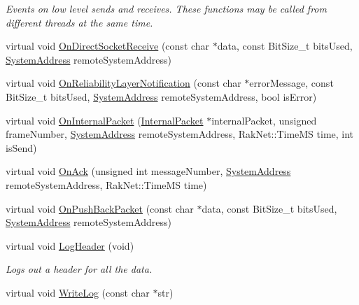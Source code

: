 \begin{DoxyCompactItemize}
\begin{DoxyCompactList}\small\item\em Events on low level sends and receives. These functions may be called from different threads at the same time. \end{DoxyCompactList}\item 
virtual void \hyperlink{class_rak_net_1_1_packet_logger_a94dd0e79e3e51933166180f3391a9387}{On\-Direct\-Socket\-Receive} (const char $\ast$data, const Bit\-Size\-\_\-t bits\-Used, \hyperlink{struct_rak_net_1_1_system_address}{System\-Address} remote\-System\-Address)
\item 
virtual void \hyperlink{class_rak_net_1_1_packet_logger_aba0d74f42ad8b50ed50e439d4d13fafb}{On\-Reliability\-Layer\-Notification} (const char $\ast$error\-Message, const Bit\-Size\-\_\-t bits\-Used, \hyperlink{struct_rak_net_1_1_system_address}{System\-Address} remote\-System\-Address, bool is\-Error)
\item 
virtual void \hyperlink{class_rak_net_1_1_packet_logger_a96775f5fb8fa1be7c55b78628ec1ae94}{On\-Internal\-Packet} (\hyperlink{struct_rak_net_1_1_internal_packet}{Internal\-Packet} $\ast$internal\-Packet, unsigned frame\-Number, \hyperlink{struct_rak_net_1_1_system_address}{System\-Address} remote\-System\-Address, Rak\-Net\-::\-Time\-M\-S time, int is\-Send)
\item 
virtual void \hyperlink{class_rak_net_1_1_packet_logger_a28c18d70969acf2857fde1c7a1b443fd}{On\-Ack} (unsigned int message\-Number, \hyperlink{struct_rak_net_1_1_system_address}{System\-Address} remote\-System\-Address, Rak\-Net\-::\-Time\-M\-S time)
\item 
virtual void \hyperlink{class_rak_net_1_1_packet_logger_aff91d53f25ba43df5778aa04bd01cc4f}{On\-Push\-Back\-Packet} (const char $\ast$data, const Bit\-Size\-\_\-t bits\-Used, \hyperlink{struct_rak_net_1_1_system_address}{System\-Address} remote\-System\-Address)
\item 
\hypertarget{class_rak_net_1_1_packet_logger_a615fbb0945d97f8d9b940f079ed45645}{virtual void \hyperlink{class_rak_net_1_1_packet_logger_a615fbb0945d97f8d9b940f079ed45645}{Log\-Header} (void)}\label{class_rak_net_1_1_packet_logger_a615fbb0945d97f8d9b940f079ed45645}

\begin{DoxyCompactList}\small\item\em Logs out a header for all the data. \end{DoxyCompactList}\item 
\hypertarget{class_rak_net_1_1_packet_logger_a25e1e0c6122cfa708d98be6799a54926}{virtual void \hyperlink{class_rak_net_1_1_packet_logger_a25e1e0c6122cfa708d98be6799a54926}{Write\-Log} (const char $\ast$str)}\label{class_rak_net_1_1_packet_logger_a25e1e0c6122cfa708d98be6799a54926}


\end{DoxyCompactItemize}
